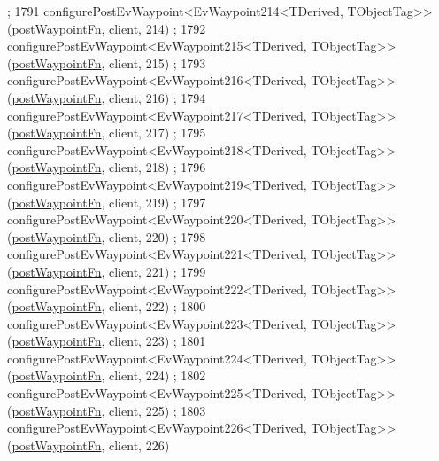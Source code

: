 \begin{DoxyCode}
      ;
1791     configurePostEvWaypoint<EvWaypoint214<TDerived, TObjectTag>>(\hyperlink{classmove__base__z__client_1_1WaypointEventDispatcher_acc538eb7506c13f7cca2268a1742dadd}{postWaypointFn}, client, 214)
      ;
1792     configurePostEvWaypoint<EvWaypoint215<TDerived, TObjectTag>>(\hyperlink{classmove__base__z__client_1_1WaypointEventDispatcher_acc538eb7506c13f7cca2268a1742dadd}{postWaypointFn}, client, 215)
      ;
1793     configurePostEvWaypoint<EvWaypoint216<TDerived, TObjectTag>>(\hyperlink{classmove__base__z__client_1_1WaypointEventDispatcher_acc538eb7506c13f7cca2268a1742dadd}{postWaypointFn}, client, 216)
      ;
1794     configurePostEvWaypoint<EvWaypoint217<TDerived, TObjectTag>>(\hyperlink{classmove__base__z__client_1_1WaypointEventDispatcher_acc538eb7506c13f7cca2268a1742dadd}{postWaypointFn}, client, 217)
      ;
1795     configurePostEvWaypoint<EvWaypoint218<TDerived, TObjectTag>>(\hyperlink{classmove__base__z__client_1_1WaypointEventDispatcher_acc538eb7506c13f7cca2268a1742dadd}{postWaypointFn}, client, 218)
      ;
1796     configurePostEvWaypoint<EvWaypoint219<TDerived, TObjectTag>>(\hyperlink{classmove__base__z__client_1_1WaypointEventDispatcher_acc538eb7506c13f7cca2268a1742dadd}{postWaypointFn}, client, 219)
      ;
1797     configurePostEvWaypoint<EvWaypoint220<TDerived, TObjectTag>>(\hyperlink{classmove__base__z__client_1_1WaypointEventDispatcher_acc538eb7506c13f7cca2268a1742dadd}{postWaypointFn}, client, 220)
      ;
1798     configurePostEvWaypoint<EvWaypoint221<TDerived, TObjectTag>>(\hyperlink{classmove__base__z__client_1_1WaypointEventDispatcher_acc538eb7506c13f7cca2268a1742dadd}{postWaypointFn}, client, 221)
      ;
1799     configurePostEvWaypoint<EvWaypoint222<TDerived, TObjectTag>>(\hyperlink{classmove__base__z__client_1_1WaypointEventDispatcher_acc538eb7506c13f7cca2268a1742dadd}{postWaypointFn}, client, 222)
      ;
1800     configurePostEvWaypoint<EvWaypoint223<TDerived, TObjectTag>>(\hyperlink{classmove__base__z__client_1_1WaypointEventDispatcher_acc538eb7506c13f7cca2268a1742dadd}{postWaypointFn}, client, 223)
      ;
1801     configurePostEvWaypoint<EvWaypoint224<TDerived, TObjectTag>>(\hyperlink{classmove__base__z__client_1_1WaypointEventDispatcher_acc538eb7506c13f7cca2268a1742dadd}{postWaypointFn}, client, 224)
      ;
1802     configurePostEvWaypoint<EvWaypoint225<TDerived, TObjectTag>>(\hyperlink{classmove__base__z__client_1_1WaypointEventDispatcher_acc538eb7506c13f7cca2268a1742dadd}{postWaypointFn}, client, 225)
      ;
1803     configurePostEvWaypoint<EvWaypoint226<TDerived, TObjectTag>>(\hyperlink{classmove__base__z__client_1_1WaypointEventDispatcher_acc538eb7506c13f7cca2268a1742dadd}{postWaypointFn}, client, 226)

\end{DoxyCode}
